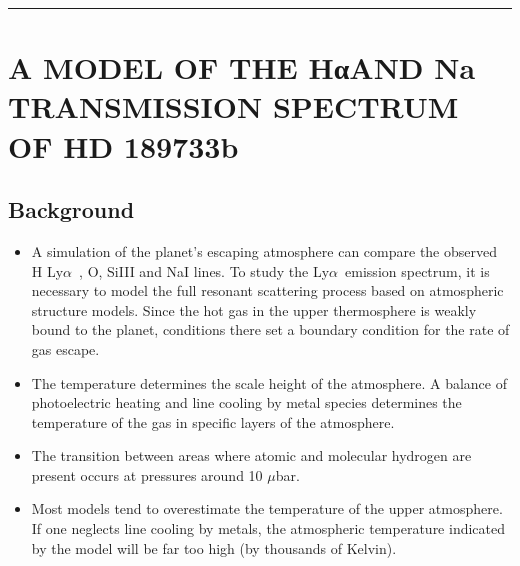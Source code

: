 \documentclass[onecolumn]{aastex63}
\newcommand\lya{Ly$\alpha$\ }
\begin{document}


\vspace{1cm}
\hrule
\vspace{1cm}

\section{A MODEL OF THE HαAND Na TRANSMISSION SPECTRUM OF HD 189733b}
\begin{centering}

\cite{2017ApJ...851..150H}

\end{centering}


\subsection{Background}

\begin{itemize}
    \item A simulation of the planet's escaping atmosphere can compare the observed H \lya, O, SiIII and NaI lines. To study the \lya emission spectrum, it is necessary to model the full resonant scattering process based on atmospheric structure models. Since the hot gas in the upper thermosphere is weakly bound to the planet, conditions there set a boundary condition for the rate of gas escape.
    \item The temperature determines the scale height of the atmosphere. A balance of photoelectric heating and line cooling by metal species determines the temperature of the gas in specific layers of the atmosphere.
    \item The transition between areas where atomic and molecular hydrogen are present occurs at pressures around 10 $\mu$bar. 
    \item Most models tend to overestimate the temperature of the upper atmosphere. If one neglects line cooling by metals, the atmospheric temperature indicated by the model will be far too high (by thousands of Kelvin). 
\end{itemize}
\end{document}
